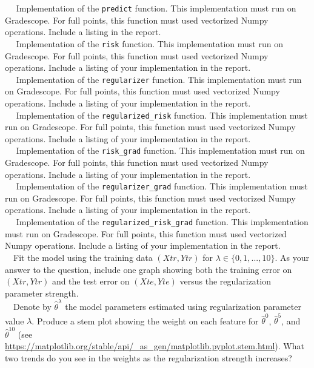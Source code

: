 \documentclass[11pt]{article}
\begin{document}
\begin{problem}{50}
~~ Implementation of the \verb|predict| function. This implementation must run on Gradescope. For full points, this function must used vectorized Numpy operations. Include a listing in the report.\\

~~ Implementation of the \verb|risk| function. This implementation must run on Gradescope. For full points, this function must used vectorized Numpy operations.  Include a listing of your implementation in the report.\\

~~ Implementation of the \verb|regularizer| function. This implementation must run on Gradescope. For full points, this function must used vectorized Numpy operations.  Include a listing of your implementation in the report.\\

~~ Implementation of the \verb|regularized_risk| function. This implementation must run on Gradescope. For full points, this function must used vectorized Numpy operations.  Include a listing of your implementation in the report.\\

~~ Implementation of the \verb|risk_grad| function. This implementation must run on Gradescope. For full points, this function must used vectorized Numpy operations.  Include a listing of your implementation in the report.\\

~~ Implementation of the \verb|regularizer_grad| function. This implementation must run on Gradescope. For full points, this function must used vectorized Numpy operations.  Include a listing of your implementation in the report.\\

~~ Implementation of the \verb|regularized_risk_grad| function. This implementation must run on Gradescope. For full points, this function must used vectorized Numpy operations.  Include a listing of your implementation in the report.\\

 ~~Fit the model using the training data  $(Xtr, Ytr)$ for $\lambda\in\{0,1,...,10\}$. As your answer to the question, include one graph showing both the training error on $(Xtr, Ytr)$ and the test error on $(Xte, Yte)$ versus the regularization parameter strength. \\

 ~~Denote by $\hat{\theta}^{\lambda}$ the model parameters estimated using regularization parameter value $\lambda$. Produce a stem plot showing the weight on each feature for $\hat{\theta}^0$, $\hat{\theta}^5$, and $\hat{\theta}^{10}$ (see \url{https://matplotlib.org/stable/api/_as_gen/matplotlib.pyplot.stem.html}). What two trends do you see in the weights as the regularization strength increases?\\


\end{problem}
\end{document}
